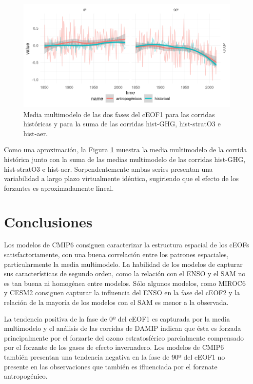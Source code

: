 \documentclass[12pt,oneside,a4paper]{reedthesis}
\begin{document}
\begin{figure}

{\centering \includegraphics{figures/50-cmip6/suma-1} 

}

\caption{Media multimodelo de las dos fases del cEOF1 para las corridas históricas y para la suma de las corridas hist-GHG, hist-stratO3 e hist-aer.}\label{fig:suma}
\end{figure}

Como una aproximación, la Figura \ref{fig:suma} muestra la media multimodelo de la corrida histórica junto con la suma de las medias multimodelo de las corridas hist-GHG, hist-stratO3 e hist-aer.
Sorpendentemente ambas series presentan una variabilidad a largo plazo virtualmente idéntica, sugiriendo que el efecto de los forzantes es aproximadamente lineal.

\hypertarget{conclusiones-2}{%
\section{Conclusiones}\label{conclusiones-2}}

Los modelos de CMIP6 consiguen caracterizar la estructura espacial de los cEOFs satisfactoriamente, con una buena correlación entre los patrones espaciales, particularmente la media multimodelo.
La habilidad de los modelos de capturar sus características de segundo orden, como la relación con el ENSO y el SAM no es tan buena ni homogénea entre modelos.
Sólo algunos modelos, como MIROC6 y CESM2 consiguen capturar la influencia del ENSO en la fase del cEOF2 y la relación de la mayoría de los modelos con el SAM es menor a la observada.

La tendencia positiva de la fase de 0º del cEOF1 es capturada por la media multimodelo y el análisis de las corridas de DAMIP indican que ésta es forzada principalmente por el forzarte del ozono estratosférico parcialmente compensado por el forzante de los gases de efecto invernadero.
Los modelos de CMIP6 también presentan una tendencia negativa en la fase de 90º del cEOF1 no presente en las observaciones que también es ifluenciada por el forznate antropogénico.
\end{document}

